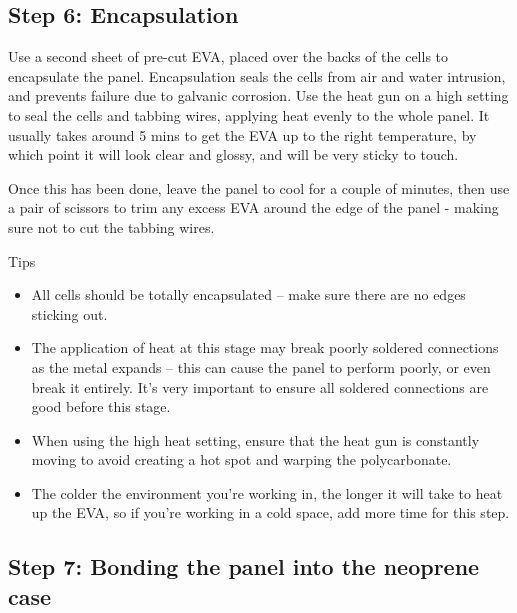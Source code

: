 \documentclass{article}
\theoremstyle{definition}
\theoremstyle{definition}
\theoremstyle{remark}
\begin{document}

  {\color{blue}\subsection{Step 6: Encapsulation}} %
  \label{sub:step_6_encapsulation}

    Use a second sheet of pre-cut EVA, placed over the backs of the cells to encapsulate the panel. Encapsulation seals the cells from air and water intrusion, and prevents failure due to galvanic corrosion. Use the heat gun on a high setting to seal the cells and tabbing wires, applying heat evenly to the whole panel. It usually takes around 5 mins to get the EVA up to the right temperature, by which point it will look clear and glossy, and will be very sticky to touch.

    Once this has been done, leave the panel to cool for a couple of minutes, then use a pair of scissors to trim any excess EVA around the edge of the panel - making sure not to cut the tabbing wires.

    Tips

    \begin{itemize}
      \item All cells should be totally encapsulated – make sure there are no edges sticking out.
      \item The application of heat at this stage may break poorly soldered connections as the metal expands – this can cause the panel to perform poorly, or even break it entirely. It's very important to ensure all soldered connections are good before this stage. 
      \item When using the high heat setting, ensure that the heat gun is constantly moving to avoid creating a hot spot and warping the polycarbonate.
      \item The colder the environment you’re working in, the longer it will take to heat up the EVA, so if you’re working in a cold space, add more time for this step.
    \end{itemize}
  

  {\color{blue}\subsection{Step 7: Bonding the panel into the neoprene case}} %
  \label{sub:step_7_bonding_the_panel_into_the_neoprene_case}
\end{document}
